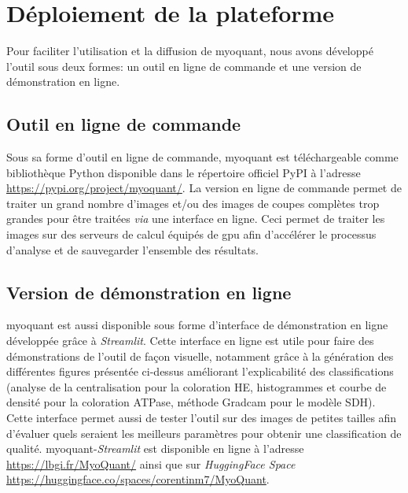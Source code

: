 \section{Déploiement de la plateforme}
Pour faciliter l'utilisation et la diffusion de \gls{myoquant}, nous avons développé l'outil sous deux formes: un outil en ligne de commande et une version de démonstration en ligne.

\subsection{Outil en ligne de commande}
Sous sa forme d'outil en ligne de commande, \gls{myoquant} est téléchargeable comme bibliothèque Python disponible dans le répertoire officiel PyPI à l'adresse \href{https://pypi.org/project/myoquant/}{https://pypi.org/project/myoquant/}. La version en ligne de commande permet de traiter un grand nombre d'images et/ou des images de coupes complètes trop grandes pour être traitées \textit{via} une interface en ligne. Ceci permet de traiter les images sur des serveurs de calcul équipés de \gls{gpu} afin d'accélérer le processus d'analyse et de sauvegarder l'ensemble des résultats.

\subsection{Version de démonstration en ligne}
\gls{myoquant} est aussi disponible sous forme d'interface de démonstration en ligne développée grâce à \textit{Streamlit}. Cette interface en ligne est utile pour faire des démonstrations de l'outil de façon visuelle, notamment grâce à la génération des différentes figures présentée ci-dessus améliorant l'explicabilité des classifications (analyse de la centralisation pour la coloration HE, histogrammes et courbe de densité pour la coloration ATPase, méthode Gradcam pour le modèle SDH). Cette interface permet aussi de tester l'outil sur des images de petites tailles afin d'évaluer quels seraient les meilleurs paramètres pour obtenir une classification de qualité. \gls{myoquant}-\textit{Streamlit} est disponible en ligne à l'adresse \href{https://lbgi.fr/MyoQuant/}{https://lbgi.fr/MyoQuant/} ainsi que sur \textit{HuggingFace Space} \href{https://huggingface.co/spaces/corentinm7/MyoQuant}{https://huggingface.co/spaces/corentinm7/MyoQuant}.

